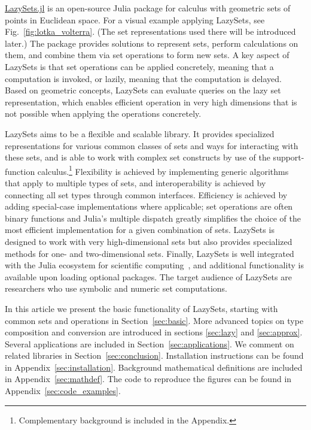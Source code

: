 \href{https://github.com/JuliaReach/LazySets.jl}{LazySets.jl} is an open-source Julia package for calculus with geometric sets of points in Euclidean space. For a visual example applying LazySets, see Fig.~\ref{fig:lotka_volterra}.
(The set representations used there will be introduced later.)
%
The package provides solutions to represent sets, perform calculations on them, and combine them via set operations to form new sets.
%
A key aspect of LazySets is that set operations can be applied concretely, meaning that a computation is invoked, or lazily, meaning that the computation is delayed.
%
Based on geometric concepts, LazySets can evaluate queries on the lazy set representation, which enables efficient operation in very high dimensions that is not possible when applying the operations concretely.

\smallskip

LazySets aims to be a flexible and scalable library.
%
It provides specialized representations for various common classes of sets and ways for interacting with these sets, and is able to work with complex set constructs by use of the support-function calculus.\footnote{Complementary background is included in the Appendix.}
%
Flexibility is achieved by implementing generic algorithms that apply to multiple types of sets, and interoperability is achieved by connecting all set types through common interfaces.
%
Efficiency is achieved by adding special-case implementations where applicable; set operations are often binary functions and Julia's multiple dispatch greatly simplifies the choice of the most efficient implementation for a given combination of sets.
%
LazySets is designed to work with very high-dimensional sets but also provides specialized methods for one- and two-dimensional sets.
%
Finally, LazySets is well integrated with the Julia ecosystem for scientific computing~\cite{bezanson2017julia}, and additional functionality is available upon loading optional packages.
%
The target audience of LazySets are researchers who use symbolic and numeric set computations.

\smallskip

In this article we present the basic functionality of LazySets, starting with common sets and operations in Section~\ref{sec:basic}.
%
More advanced topics on type composition and conversion are introduced in sections \ref{sec:lazy} and \ref{sec:approx}.
%
Several applications are included in Section~\ref{sec:applications}.
%
We comment on related libraries in Section~\ref{sec:conclusion}.
%
Installation instructions can be found in Appendix~\ref{sec:installation}.
%
Background mathematical definitions are included in Appendix~\ref{sec:mathdef}.
%
The code to reproduce the figures can be found in Appendix~\ref{sec:code_examples}.

